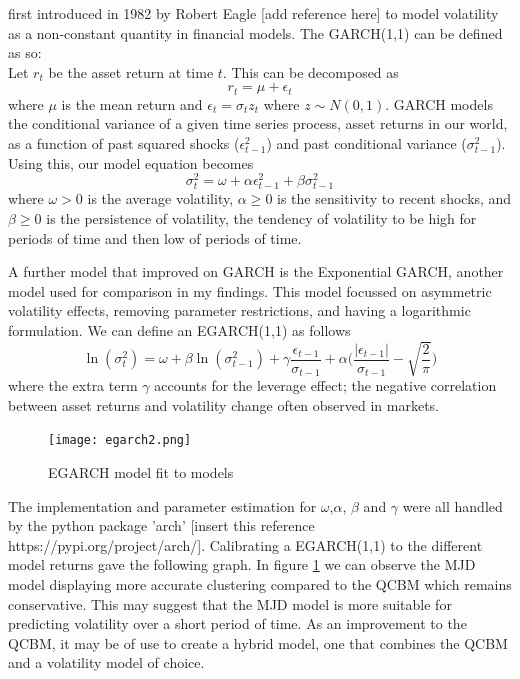 \documentclass[12pt]{article}
\newcommand{\newp}
    {
    \vskip 0.5cm 
  }
\numberwithin{equation}{section}
\begin{document}
first introduced in 1982 by Robert Eagle [add reference here] to model volatility 
as a non-constant quantity in financial models. The GARCH(1,1) can be defined as 
so:\\ 
Let $r_t$ be the asset return at time $t$. This can be decomposed as 
\begin{equation}
r_t = \mu + \epsilon_t
\end{equation}
where $\mu$ is the mean return and $\epsilon_t = \sigma_t z_t$ where $z \sim N(0,1)$. 
GARCH models the conditional variance of a given time series process, asset returns in 
our world, as a function of past squared shocks ($\epsilon^2_{t-1}$) and past 
conditional variance ($\sigma^2_{t-1}$). Using this, our model equation becomes
\begin{equation}
  \sigma^2_t = \omega + \alpha\epsilon^2_{t-1} + \beta\sigma^2_{t-1}
\end{equation}
where $\omega > 0$ is the average volatility, $\alpha \geq 0$ is the sensitivity 
to recent shocks, and $\beta \geq0$ is the persistence of volatility, the tendency
of volatility to be high for periods of time and then low of periods of time. 
\newp 
A further model that improved on GARCH is the Exponential GARCH, another model used 
for comparison in my findings. This model focussed on asymmetric volatility 
effects, removing parameter restrictions, and having a logarithmic formulation. 
We can define an EGARCH(1,1) as follows 
\begin{equation}
  \ln(\sigma^2_t) = \omega +\beta\ln(\sigma^2_{t-1})+\gamma\frac{\epsilon_{t-1}}
  {\sigma_{t-1}} + \alpha\Biggl(\frac{|\epsilon_{t-1}|}{\sigma_{t-1}}-\sqrt{\frac{2}{\pi}}\Biggr)
\end{equation}
where the extra term $\gamma$ accounts for the leverage effect; the 
negative correlation between asset returns and volatility change often 
observed in markets.
\newp 
\begin{figure}[h!]
  \centering 
  \texttt{[image: egarch2.png]}
  \caption{EGARCH model fit to models}
  \label{fig:egarch2}
\end{figure}
The implementation and parameter estimation for $\omega$,$\alpha$, $\beta$ and 
$\gamma$ were all handled by 
the python package 'arch' [insert this reference https://pypi.org/project/arch/]. 
Calibrating a EGARCH(1,1) to the different model returns gave the following graph. 
In figure \ref{fig:egarch2} we can observe the MJD model displaying more accurate 
clustering compared to the QCBM which remains conservative. This may suggest that 
the MJD model is more suitable for predicting volatility over a short period of 
time. As an improvement to the QCBM, it may be of use to create a hybrid model, 
one that combines the QCBM and a volatility model of choice. 
\end{document}
